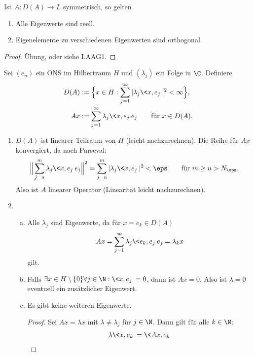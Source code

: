 \begin{st} \label{1.18}
	Ist $A: D(A) \to L$ symmetrisch, so gelten
	\begin{enumerate}[1)]
		\item
			Alle Eigenwerte sind reell.
		\item
			Eigenelemente zu verschiedenen Eigenwerten sind orthogonal.
	\end{enumerate}
	\begin{proof}
		Übung, oder siehe LAAG1.
	\end{proof}
\end{st}

\begin{ex} \label{1.19}
	Sei $(e_n)$ ein ONS im Hilbertraum $H$ und $(\lambda_j)$ ein Folge in $\C$.
	Definiere
	\begin{align*}
		D(A) &:= \Big\{x \in H : \sum_{j=1}^\infty |\lambda_j \<x,e_j\> |^2 < \infty \Big\}, \\
		Ax &:= \sum_{j=1}^\infty \lambda_j \<x,e_j\> e_j \qquad \text{für } x \in D(A).
	\end{align*}
	\begin{enumerate}[1)]
		\item
			$D(A)$ ist linearer Teilraum von $H$ (leicht nachzurechnen).
			Die Reihe für $Ax$ konvergiert, da nach Parseval:
			\begin{align*}
				\Big\| \sum_{j=n}^m \lambda_j \<x,e_j\> e_j \Big\|^2
				= \sum_{j=n}^m |\lambda_j \<x,e_j\> |^2
				< \eps
				\qquad \text{für } m \ge n > N_\eps.
			\end{align*}
			Also ist $A$ linearer Operator (Linearität leicht nachzurechnen).
		\item
			\begin{enumerate}[a)]
				\item
					Alle $\lambda_j$ sind Eigenwerte, da für $x = e_k \in D(A)$
					\[
						Ax = \sum_{j=1}^\infty \lambda_j \<e_k,e_j\> e_j = \lambda_k x
					\]
					gilt.
				\item
					Falls $\exists x \in H\setminus \{0\} \forall j \in \N : \<x,e_j\> = 0$, dann ist $Ax = 0$.
					Also ist $\lambda = 0$ eventuell ein zusätzlicher Eigenwert.
				\item
					Es gibt keine weiteren Eigenwerte.
					\begin{proof}
						Sei $Ax = \lambda x$ mit $\lambda \neq \lambda_j$ für $j \in \N$.
						Dann gilt für alle $k \in \N$:
						\begin{align*}
							\lambda \<x,e_k\> 
							&= \<Ax, e_k\> \\ 

\end{align*}
\end{proof}
\end{enumerate}
\end{enumerate}
\end{ex}
